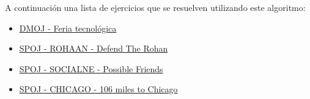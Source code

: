 A continuación una lista de ejercicios que se resuelven utilizando este algoritmo:

\begin{itemize}
	\item \href{https://dmoj.uclv.edu.cu/problem/feria} {DMOJ - Feria tecnológica}
	\item \href{https://www.spoj.com/problems/ROHAAN/} {SPOJ - ROHAAN - Defend The Rohan}
	\item \href{https://www.spoj.com/problems/SOCIALNE/} {SPOJ - SOCIALNE - Possible Friends}
	\item \href{https://www.spoj.com/problems/CHICAGO/} {SPOJ - CHICAGO - 106 miles to Chicago}
\end{itemize}